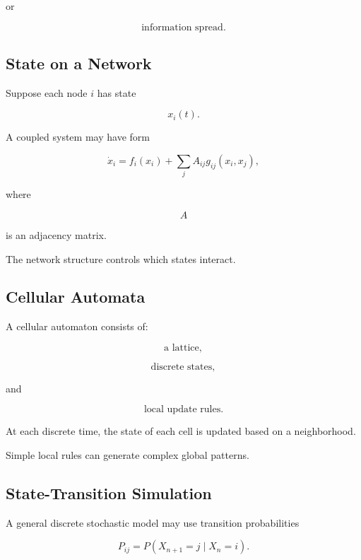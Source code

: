 or

\[
\boxed{
\text{information spread}.
}
\]

\subsection{State on a Network}
\label{subsec:state-on-network}

Suppose each node \(i\) has state

\[
x_i(t).
\]

A coupled system may have form

\[
\boxed{
\dot{x}_i
=
f_i(x_i)
+
\sum_{j}
A_{ij}
g_{ij}(x_i,x_j),
}
\]

where

\[
A
\]

is an adjacency matrix.

The network structure controls which states interact.

\subsection{Cellular Automata}
\label{subsec:cellular-automata-simulation}

A cellular automaton consists of:

\[
\boxed{
\text{a lattice},
}
\]

\[
\boxed{
\text{discrete states},
}
\]

and

\[
\boxed{
\text{local update rules}.
}
\]

At each discrete time, the state of each cell is updated based on a
neighborhood.

Simple local rules can generate complex global patterns.

\subsection{State-Transition Simulation}
\label{subsec:state-transition-simulation}

A general discrete stochastic model may use transition probabilities

\[
\boxed{
P_{ij}
=
P(X_{n+1}=j\mid X_n=i).
}
\]

